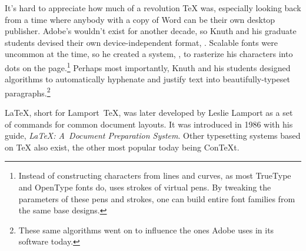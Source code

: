 It's hard to appreciate how much of a revolution \TeX{} was,
especially looking back from a time where anybody with a copy
of Word can be their own desktop publisher.
Adobe's  wouldn't exist for another decade, so Knuth
and his graduate students devised their own device-independent format,
.
Scalable fonts were uncommon at the time, so he created a system,
\MF, to rasterize his characters into dots on the
page.\punckern\footnote{%
Instead of constructing characters from lines and curves,
as most TrueType and OpenType fonts do,
\MF{} uses strokes of virtual pens.
By tweaking the parameters of these pens and strokes, one can build entire
font families from the same base designs.}
Perhaps most importantly, Knuth and his students designed algorithms
to automatically hyphenate and justify text into
beautifully-typeset paragraphs.\punckern\footnote{These same algorithms went
on to influence the ones Adobe uses in its software today.\punckern{}}

\LaTeX{}, short for Lamport~\TeX{}, was later developed by Leslie Lamport
as a set of commands for common document layouts.
It was introduced in 1986 with his guide,
\textit{\LaTeX: A~Document Preparation System}.
Other typesetting systems based on \TeX{} also exist,
the other most popular today being Con\TeX{}t.

